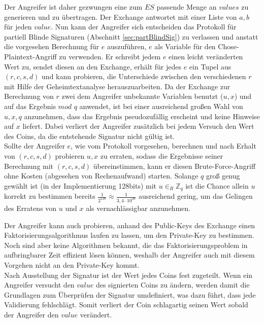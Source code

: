 \documentclass[
	fontsize=12pt,
	headings=small,
	parskip=half,           %
	bibliography=totoc,
	numbers=noenddot,       %
	open=any,               %
]{scrreprt}
\begin{document}
Der Angreifer ist daher gezwungen eine zum $ES$ passende Menge an $values$ zu generieren und zu übertragen. Der Exchange antwortet mit einer Liste von $a,b$ für jeden $value$. Nun kann der Angreifer sich entscheiden das Protokoll für partiell Blinde Signaturen (Abschnitt \ref{sec:partBlindSig}) zu verlassen und anstatt die vorgesehen Berechnung für $e$ auszuführen, $e$ als Variable für den Chose-Plaintext-Angriff zu verwenden. Er schreibt jedem $e$ einen leicht veränderten Wert zu, sendet diesen an den Exchange, erhält für jedes $e$ ein Tupel aus $(r,c,s,d)$ und kann probieren, die Unterschiede zwischen den verschiedenen $r$ mit Hilfe der Geheimtextanalyse herauszuarbeiten.  Da der Exchange zur Berechnung von $r$ zwei dem Angreifer unbekannte Variablen benutzt ($u,x$) und auf das Ergebnis $mod$ $q$ anwendet, ist bei einer ausreichend großen Wahl von $u,x,q$ anzunehmen, dass das Ergebnis pseudozufällig erscheint und keine Hinweise auf $x$ liefert. Dabei verliert der Angreifer zusätzlich bei jedem Versuch den Wert des Coins, da die entstehende Signatur nicht gültig ist.\\

Sollte der Angreifer $e$, wie vom Protokoll vorgesehen, berechnen und nach Erhalt von $(r,c,s,d)$ probieren $u,x$ zu erraten, sodass die Ergebnisse seiner Berechnung mit $(r,c,s,d)$ übereinstimmen, kann er diesen Brute-Force-Angriff ohne Kosten (abgesehen von Rechenaufwand) starten. Solange $q$ groß genug gewählt ist (in der Implementierung 128bits) mit $u{\in}_{R} {\mathbb{Z}}_{q}$ ist die Chance allein $u$ korrekt zu bestimmen bereits $\frac{1}{2^{128}} \approx \frac{1}{3,4\cdot10^{38}}$ ausreichend gering, um das Gelingen des Erratens von $u$ und $x$ als vernachlässigbar anzunehmen.

Der Angreifer kann auch probieren, anhand des Public-Keys des Exchange einen Faktorisierungsalgorithmus laufen zu lassen, um den Private-Key zu bestimmen. Noch sind aber keine Algorithmen bekannt, die das Faktorisierungsproblem in aufbringbarer Zeit effizient lösen können, weshalb der Angreifer auch mit diesem Vorgehen nicht an den Private-Key kommt.\\

Nach Ausstellung der Signatur ist der Wert jedes Coins fest zugeteilt. Wenn ein Angreifer versucht den $value$ des signierten Coins zu ändern, werden damit die Grundlagen zum Überprüfen der Signatur umdefiniert, was dazu führt, dass jede Validierung fehlschlägt. Somit verliert der Coin schlagartig seinen Wert sobald der Angreifer den $value$ verändert.\\
\end{document}
